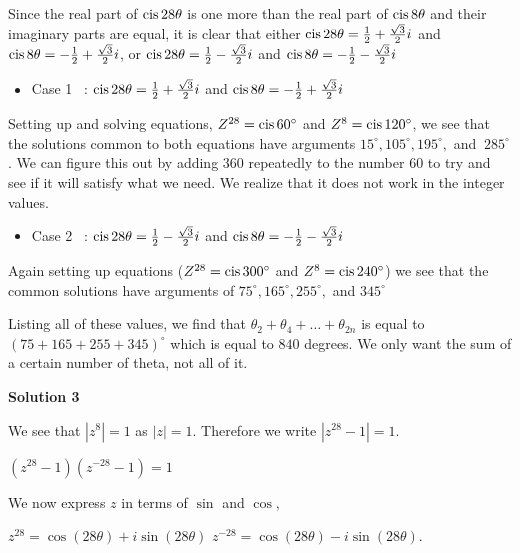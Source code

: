 \begin{enumerate}
 Since the real part of $\text{cis\,}{28}\theta$ is one more than the real part of $\text{cis\,} {8}\theta$ and their imaginary parts are equal, it is clear that either $\text{cis\,}{28}\theta = \frac{1}{2}+\frac {\sqrt{3}}{2}i$ and $\text{cis\,} {8}\theta =  -\frac{1}{2}+\frac {\sqrt{3}}{2}i$, or $\text{cis\,}{28}\theta = \frac{1}{2} - \frac{\sqrt{3}}{2}i$ and  $\text{cis\,} {8}\theta =  -\frac{1}{2}- \frac{\sqrt{3}}{2}i$

            \begin{itemize}
        \item Case 1  : $\text{cis\,}{28}\theta = \frac{1}{2}+ \frac{\sqrt{3}}{2}i$ and $\text{cis\,} {8}\theta =  -\frac{1}{2}+\frac{\sqrt{3}}{2}i$
            \end{itemize}
            Setting up and solving equations, $Z^{28}= \text{cis\,}{60^\circ}$ and $Z^8= \text{cis\,}{120^\circ}$, we see that the solutions common to both equations have arguments $15^\circ , 105^\circ, 195^\circ,$ and $\ 285^\circ$. We can figure this out by adding 360 repeatedly to the number 60 to try and see if it will satisfy what we need. We realize that it does not work in the integer values.

 
            \begin{itemize}
        \item Case 2  : $\text{cis\,}{28}\theta = \frac{1}{2} -\frac {\sqrt{3}}{2}i$ and $\text{cis\,} {8}\theta =  -\frac {1}{2} -\frac{\sqrt{3}}{2}i$
            \end{itemize}
            Again setting up equations ($Z^{28}= \text{cis\,}{300^\circ}$ and $Z^{8} = \text{cis\,}{240^\circ}$) we see that the common solutions have arguments of  $75^\circ, 165^\circ, 255^\circ,$ and $345^\circ$

 Listing all of these values, we find that $\theta_{2} + \theta_{4} + \ldots + \theta_{2n}$ is equal to $(75 + 165 + 255 + 345) ^\circ$ which is equal to $\boxed {840}$ degrees. We only want the sum of a certain number of theta, not all of it.

 



\textbf{Solution 3}

We see that $|z^8|=1$ as $|z|=1$. Therefore we write $|z^{28} -1|=1$. 

 $(z^{28} -1)(z^{-28} -1)=1$

 We now express $z$ in terms of $\sin$ and $\cos$, 

 $z^28=\cos(28\theta) + i\sin(28\theta)$
$z^{-28}=\cos(28\theta) - i\sin(28\theta)$.


\end{enumerate}
